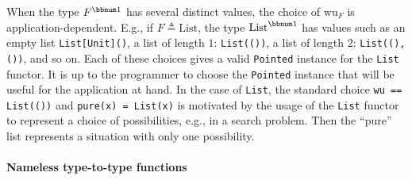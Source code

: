 When the type $F^{\bbnum 1}$ has several distinct values, the choice
of $\text{wu}_{F}$ is application-dependent. E.g., if $F\triangleq\text{List}$,
the type $\text{List}^{\bbnum 1}$ has values such as an empty list
\lstinline!List[Unit]()!, a list of length $1$: \lstinline!List(())!,
a list of length $2$: \lstinline!List((), ())!, and so on. Each
of these choices gives a valid \lstinline!Pointed! instance for the
\lstinline!List! functor. It is up to the programmer to choose the
\lstinline!Pointed! instance that will be useful for the application
at hand. In the case of \lstinline!List!, the standard choice \lstinline!wu == List(())!
and \lstinline!pure(x) = List(x)! is motivated by the usage of the
\lstinline!List! functor to represent a choice of possibilities,
e.g., in a search problem. Then the \textsf{``}pure\textsf{''} list represents a situation
with only one possibility.

\paragraph{Nameless type-to-type functions}

